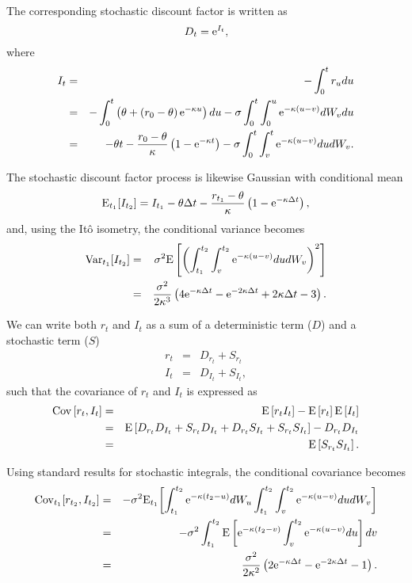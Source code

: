 The corresponding stochastic discount factor is written as
\begin{equation}
D_{t} = \text{e}^{I_t},
\end{equation}
where
\begin{eqnarray}
I_t &=& -\int_0^t r_u du \\
&=& - \int_0^t \left( \theta + \left( r_0 - \theta \right) \text{e}^{-\kappa u } \right) du - \sigma \int_0^t \int_0^u \text{e}^{-\kappa \left(u - v\right)} dW_v du \\
&=& - \theta t - \frac{r_0 - \theta}{\kappa} \left( 1 - \text{e}^{-\kappa t} \right) - \sigma \int_0^t \int_v^t \text{e}^{-\kappa \left(u - v\right)} du dW_v.
\end{eqnarray}

The stochastic discount factor process is likewise Gaussian with conditional mean
\begin{equation}
\mathrm{E}_{t_1}\! \left[ I_{t_{2}} \right] = I_{t_1} - \theta \Delta t 
- \frac{r_{t_1} - \theta}{\kappa} \left( 1 - \text{e}^{-\kappa \Delta t} \right),
\end{equation}
and, using the It\^{o} isometry, the conditional variance becomes
\begin{eqnarray}
\mathrm{Var}_{t_1}\! \left[ I_{t_{2}} \right] &=& \sigma^2 \mathrm{E} \left[ \left( \int_{t_1}^{t_2} \int_v^{t_2} \text{e}^{-\kappa \left(u - v\right)} du dW_v \right)^2 \right] \\
&=& \frac{\sigma^2}{2 \kappa^3} \left( 4 \text{e}^{-\kappa \Delta t} - \text{e}^{-2\kappa \Delta t} + 2 \kappa \Delta t - 3 \right).
\end{eqnarray}

We can write both $r_t$ and $I_t$ as a sum of a deterministic term ($D$) and a stochastic term ($S$)
\begin{eqnarray}
r_t &=& D_{r_t} + S_{r_t} \\
I_t &=& D_{I_t} + S_{I_t},
\end{eqnarray}
such that the covariance of $r_t$ and $I_t$ is expressed as
\begin{eqnarray}
\mathrm{Cov} \left[ r_t, I_t \right] &=& \mathrm{E} \left[ r_t I_t \right] - \mathrm{E} \left[ r_t \right] \mathrm{E} \left[ I_t \right] \\
&=& \mathrm{E} \left[ D_{r_t} D_{I_t} + S_{r_t} D_{I_t} + D_{r_t} S_{I_t} + S_{r_t} S_{I_t} \right] - D_{r_t} D_{I_t} \\
&=& \mathrm{E} \left[ S_{r_t} S_{I_t} \right].
\end{eqnarray}

Using standard results for stochastic integrals, the conditional covariance becomes
\begin{eqnarray}
\mathrm{Cov}_{t_1}\! \left[ r_{t_2}, I_{t_2} \right] &=& - \sigma^2 \mathrm{E}_{t_1}\! \left[ \int_{t_1}^{t_2} \text{e}^{-\kappa (t_2 - u)} dW_u \int_{t_1}^{t_2} \int_v^{t_2} \text{e}^{-\kappa(u-v)} du dW_v \right] \\
&=& -\sigma^2 \int_{t_1}^{t_2} \mathrm{E} \left[ \text{e}^{-\kappa(t_2-v)} \int_v^{t_2} \text{e}^{-\kappa(u-v)} du \right] dv \\
&=& \frac{\sigma^2}{2 \kappa^2} \left( 2 \text{e}^{-\kappa \Delta t} - \text{e}^{-2\kappa \Delta t} - 1 \right).
\end{eqnarray}

